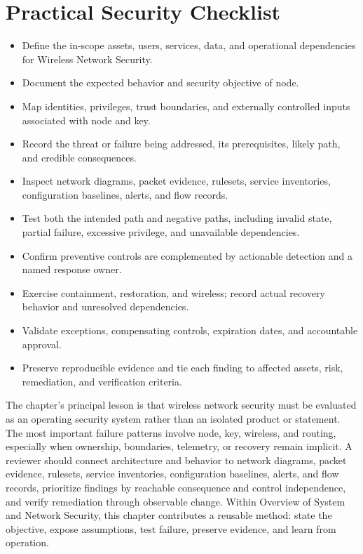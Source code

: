 \documentclass[11pt]{article}
\begin{document}
\section*{Practical Security Checklist}
\begin{itemize}[label=$\square$]
\item Define the in-scope assets, users, services, data, and operational dependencies for Wireless Network Security.
\item Document the expected behavior and security objective of node.
\item Map identities, privileges, trust boundaries, and externally controlled inputs associated with node and key.
\item Record the threat or failure being addressed, its prerequisites, likely path, and credible consequences.
\item Inspect network diagrams, packet evidence, rulesets, service inventories, configuration baselines, alerts, and flow records.
\item Test both the intended path and negative paths, including invalid state, partial failure, excessive privilege, and unavailable dependencies.
\item Confirm preventive controls are complemented by actionable detection and a named response owner.
\item Exercise containment, restoration, and wireless; record actual recovery behavior and unresolved dependencies.
\item Validate exceptions, compensating controls, expiration dates, and accountable approval.
\item Preserve reproducible evidence and tie each finding to affected assets, risk, remediation, and verification criteria.
\end{itemize}
\begin{synthesisbox}
The chapter's principal lesson is that wireless network security must be evaluated as an operating security system rather than an isolated product or statement. The most important failure patterns involve node, key, wireless, and routing, especially when ownership, boundaries, telemetry, or recovery remain implicit. A reviewer should connect architecture and behavior to network diagrams, packet evidence, rulesets, service inventories, configuration baselines, alerts, and flow records, prioritize findings by reachable consequence and control independence, and verify remediation through observable change. Within Overview of System and Network Security, this chapter contributes a reusable method: state the objective, expose assumptions, test failure, preserve evidence, and learn from operation.
\end{synthesisbox}
\end{document}
